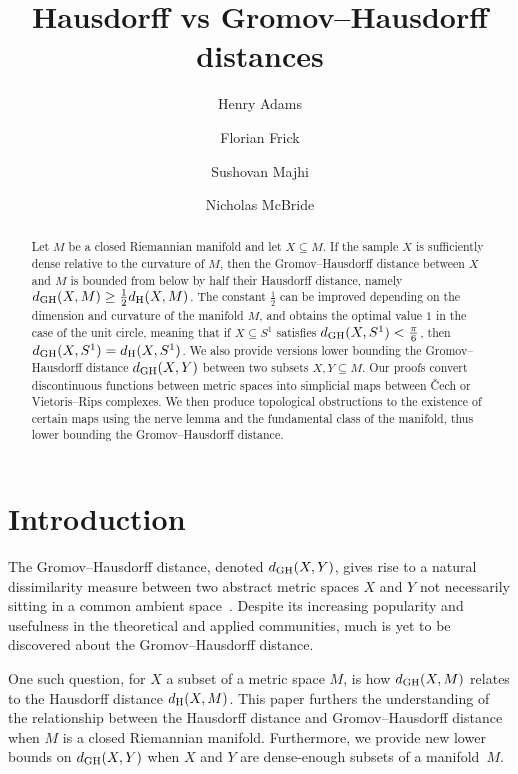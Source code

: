 \documentclass[11pt, reqno, english]{amsart}
\begin{document}
\title{
Hausdorff vs Gromov--Hausdorff distances
}

\author{Henry Adams}
\author{Florian Frick}
\author{Sushovan Majhi}
\author{Nicholas McBride}

\begin{abstract}
Let $M$ be a closed Riemannian manifold and let $X\subseteq M$.
If the sample $X$ is sufficiently dense relative to the curvature of $M$, then the Gromov--Hausdorff distance between $X$ and $M$ is bounded from below by half their Hausdorff distance, namely $d_{\mathrm{GH}}(X,M) \ge \frac{1}{2} d_{\mathrm{H}}(X,M)$.
The constant $\frac{1}{2}$ can be improved depending on the dimension and curvature of the manifold $M$, and obtains the optimal value $1$ in the case of the unit circle, meaning that if $X\subseteq S^1$ satisfies $d_{\mathrm{GH}}(X,S^1)<\tfrac{\pi}{6}$, then $d_{\mathrm{GH}}(X,S^1)=d_{\mathrm{H}}(X,S^1)$.
We also provide versions lower bounding the Gromov--Hausdorff distance $d_{\mathrm{GH}}(X,Y)$ between two subsets $X,Y\subseteq M$.
Our proofs convert discontinuous functions between metric spaces into simplicial maps between \v{C}ech or Vietoris--Rips complexes.
We then produce topological obstructions to the existence of certain maps using the nerve lemma and the fundamental class of the manifold, thus lower bounding the Gromov--Hausdorff distance.
\end{abstract}


\maketitle


\section{Introduction}
The Gromov--Hausdorff distance, denoted $d_{\mathrm{GH}}(X,Y)$, gives rise to a natural dissimilarity measure between two abstract metric spaces $X$ and $Y$ not necessarily sitting in a common ambient space~\cite{edwards1975structure,gromov1981groups, gromov1981structures}.
Despite its increasing popularity and usefulness in the theoretical and applied communities, much is yet to be discovered about the Gromov--Hausdorff distance. 

One such question, for $X$ a subset of a metric space $M$, is how $d_{\mathrm{GH}}(X,M)$ relates to the Hausdorff distance $d_{\mathrm{H}}(X,M)$. 
This paper furthers the understanding of the relationship between the Hausdorff distance and Gromov--Hausdorff distance when $M$ is a closed Riemannian manifold.
Furthermore, we provide new lower bounds on $d_{\mathrm{GH}}(X,Y)$ when $X$ and $Y$ are dense-enough subsets of a manifold~$M$.
\end{document}
